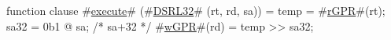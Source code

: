 function clause #\hyperref[zexecute]{execute}# (#\hyperref[zDSRLthreetwo]{DSRL32}# (rt, rd, sa)) =
  {
    temp     = #\hyperref[zrGPR]{rGPR}#(rt);
    sa32 = 0b1 @ sa; /* sa+32 */
    #\hyperref[zwGPR]{wGPR}#(rd) = temp >> sa32;
  }
